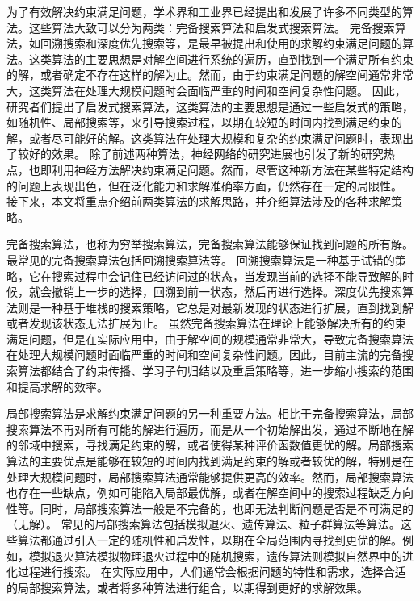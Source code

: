 为了有效解决约束满足问题，学术界和工业界已经提出和发展了许多不同类型的算法。这些算法大致可以分为两类：完备搜索算法\cite{van2006backtracking}和启发式搜索算法\cite{hoos2006local}。
完备搜索算法，如回溯搜索和深度优先搜索等，是最早被提出和使用的求解约束满足问题的算法。这类算法的主要思想是对解空间进行系统的遍历，直到找到一个满足所有约束的解，或者确定不存在这样的解为止。然而，由于约束满足问题的解空间通常非常大，这类算法在处理大规模问题时会面临严重的时间和空间复杂性问题。
因此，研究者们提出了启发式搜索算法，这类算法的主要思想是通过一些启发式的策略，如随机性、局部搜索等，来引导搜索过程，以期在较短的时间内找到满足约束的解，或者尽可能好的解。这类算法在处理大规模和复杂的约束满足问题时，表现出了较好的效果。
除了前述两种算法，神经网络的研究进展也引发了新的研究热点，也即利用神经方法解决约束满足问题。然而，尽管这种新方法在某些特定结构的问题上表现出色，但在泛化能力和求解准确率方面，仍然存在一定的局限性。
接下来，本文将重点介绍前两类算法的求解思路，并介绍算法涉及的各种求解策略。

完备搜索算法，也称为穷举搜索算法，完备搜索算法能够保证找到问题的所有解。最常见的完备搜索算法包括回溯搜索算法等。
回溯搜索算法是一种基于试错的策略，它在搜索过程中会记住已经访问过的状态，当发现当前的选择不能导致解的时候，就会撤销上一步的选择，回溯到前一状态，然后再进行选择。深度优先搜索算法则是一种基于堆栈的搜索策略，它总是对最新发现的状态进行扩展，直到找到解或者发现该状态无法扩展为止。
虽然完备搜索算法在理论上能够解决所有的约束满足问题，但是在实际应用中，由于解空间的规模通常非常大，导致完备搜索算法在处理大规模问题时面临严重的时间和空间复杂性问题。因此，目前主流的完备搜索算法都结合了约束传播\cite{bartak2001theory}、学习子句归结\cite{beame2003understanding}以及重启策略\cite{huang2007effect}等，进一步缩小搜索的范围和提高求解的效率。

局部搜索算法是求解约束满足问题的另一种重要方法。相比于完备搜索算法，局部搜索算法不再对所有可能的解进行遍历，而是从一个初始解出发，通过不断地在解的邻域中搜索，寻找满足约束的解，或者使得某种评价函数值更优的解。局部搜索算法的主要优点是能够在较短的时间内找到满足约束的解或者较优的解，特别是在处理大规模问题时，局部搜索算法通常能够提供更高的效率。然而，局部搜索算法也存在一些缺点，例如可能陷入局部最优解，或者在解空间中的搜索过程缺乏方向性等。同时，局部搜索算法一般是不完备的，也即无法判断问题是否是不可满足的（无解）。
常见的局部搜索算法包括模拟退火\cite{van1987simulated}、遗传算法\cite{mirjalili2019genetic}、粒子群算法\cite{wang2018particle}等算法。这些算法都通过引入一定的随机性和启发性，以期在全局范围内寻找到更优的解。例如，模拟退火算法模拟物理退火过程中的随机搜索，遗传算法则模拟自然界中的进化过程进行搜索。
在实际应用中，人们通常会根据问题的特性和需求，选择合适的局部搜索算法，或者将多种算法进行组合，以期得到更好的求解效果。

